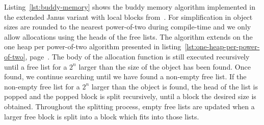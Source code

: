 Listing~\ref{lst:buddy-memory} shows the buddy memory algorithm implemented in the extended Janus variant with local blocks from~\cite{ty:ejanus}. For simplification in object sizes are rounded to the nearest power-of-two during compile-time and we only allow allocations using the heads of the free lists. The algorithm extends on the one heap per power-of-two algorithm presented in listing~\ref{lst:one-heap-per-power-of-two}, page~\pageref{lst:one-heap-per-power-of-two}.
The body of the allocation function is still executed recursively until a free list for a $2^n$ larger than the size of the object has been found. Once found, we continue searching until we have found a non-empty free list. If the non-empty free list for a $2^n$ larger than the object is found, the head of the list is popped and the popped block is split recursively, until a block the desired size is obtained. Throughout the splitting process, empty free lists are updated when a larger free block is split into a block which fits into those lists. 


